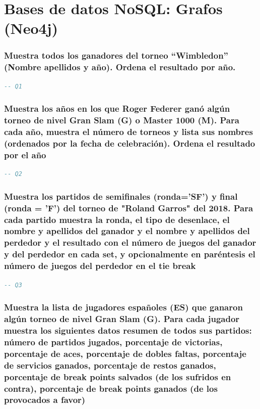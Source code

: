 \documentclass[10pt]{opticajnl}
\begin{document}
\section{Bases de datos NoSQL: Grafos (Neo4j)}

\subsubsection{Muestra todos los ganadores del torneo ``Wimbledon'' (Nombre apellidos y año). Ordena el resultado por año.}

\begin{lstlisting}[language=SQL]
-- Q1
\end{lstlisting}





\subsubsection{Muestra los años en los que Roger Federer ganó algún torneo de nivel Gran Slam (G) o Master 1000 (M). Para cada año, muestra el número de torneos y lista sus nombres (ordenados por la fecha de celebración). Ordena el resultado por el año}

\begin{lstlisting}[language=SQL]
-- Q2
\end{lstlisting}





\subsubsection{Muestra los partidos de semiﬁnales (ronda='SF') y ﬁnal (ronda = 'F') del torneo de "Roland Garros" del 2018. Para cada partido muestra la ronda, el tipo de desenlace, el nombre y apellidos del ganador y el nombre y apellidos del perdedor y el resultado con el número de juegos del ganador y del perdedor en cada set, y opcionalmente en paréntesis el número de juegos del perdedor en el tie break}

\begin{lstlisting}[language=SQL]
-- Q3
\end{lstlisting}





\subsubsection{Muestra la lista de jugadores españoles (ES) que ganaron algún torneo de nivel Gran Slam (G). Para cada jugador muestra los siguientes datos resumen de todos sus partidos: número de partidos jugados, porcentaje de victorias, porcentaje de aces, porcentaje de dobles faltas, porcentaje de servicios ganados, porcentaje de restos ganados, porcentaje de break points salvados (de los sufridos en contra), porcentaje de break points ganados (de los provocados a favor)}
\end{document}
